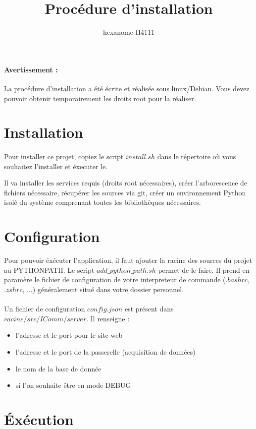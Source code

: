 \documentclass[10pt,a4paper]{article}
\author{hexanome H4111}
\title{Procédure d'installation}
\begin{document}
\paragraph{Avertissement : }La procédure d'installation a été écrite et réalisée sous linux/Debian. Vous devez pouvoir obtenir temporairement les droits root pour la réaliser.
\section{Installation}
\paragraph{} Pour installer ce projet, copiez le script $install.sh$ dans le répertoire où vous souhaitez l'installer et éxecuter le.

Il va installer les services requis (droits root nécessaires), créer l'arborescence de fichiers nécessaire, récupérer les sources via git, créer un environnement Python isolé du système comprenant toutes les bibliothèques nécessaires.

\section{Configuration}
Pour pouvoir éxécuter l'application, il faut ajouter la racine des sources du projet au PYTHONPATH. Le script $add\_python\_path.sh$ permet de le faire. Il prend en paramère le fichier de configuration de votre interpreteur de commande ($.bashrc$,$.zshrc$, ...) généralement situé dans votre dossier personnel.
\paragraph{} Un fichier de configuration $config.json$ est présent dans $racine/src/IComm/server$. Il renseigne  : 
\begin{itemize}
\item l'adresse et le port pour le site web
\item l'adresse et le port de la passerelle (acquisition de données)
\item le nom de la base de donnée
\item si l'on souhaite être en mode DEBUG
\end{itemize}
\section{\'{E}xécution}
\end{document}
